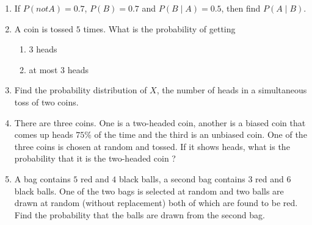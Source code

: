 \begin{enumerate}
\item If $P(not A) =0.7$, $P(B)=0.7$ and $P(B\mid A)=0.5$, then find $P(A\mid B)$.

\item A coin is tossed $5$ times. What is the probability of getting 
\begin{enumerate}[label=(\roman*)]
    \item $3$ heads
    \item at most $3$ heads
\end{enumerate}

\item Find the probability distribution of $X$, the number of heads in a simultaneous toss of two coins.

\item There are three coins. One is a two-headed coin, another is a biased coin that comes up heads $75\%$ of the time and the third is an unbiased coin. One of the three coins is chosen at random and tossed. If it shows heads, what is the probability that it is the two-headed coin ?

\item A bag contains $5$ red and $4$ black balls, a second bag contains $3$ red and $6$ black balls. One of the two bags is selected at random and two balls are drawn at random (without replacement) both of which are found to be red. Find the probability that the balls are drawn from the second bag.
\end{enumerate}
